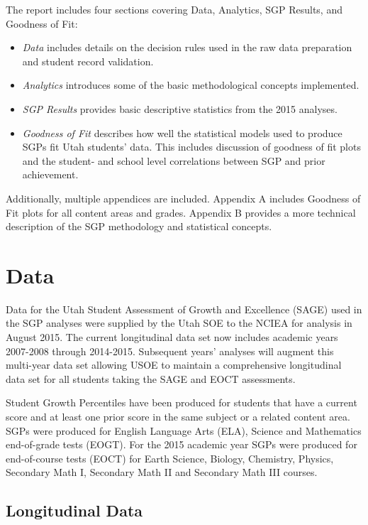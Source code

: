 \documentclass[12pt]{article}
\begin{document}
The report includes four sections covering Data, Analytics, SGP Results,
and Goodness of Fit:

\begin{itemize}
\itemsep1pt\parskip0pt
\item
  \emph{Data} includes details on the decision rules used in the raw
  data preparation and student record validation.
\item
  \emph{Analytics} introduces some of the basic methodological concepts
  implemented.
\item
  \emph{SGP Results} provides basic descriptive statistics from the 2015
  analyses.
\item
  \emph{Goodness of Fit} describes how well the statistical models used
  to produce SGPs fit Utah students' data. This includes discussion of
  goodness of fit plots and the student- and school level correlations
  between SGP and prior achievement.
\end{itemize}

Additionally, multiple appendices are included. Appendix A includes
Goodness of Fit plots for all content areas and grades. Appendix B
provides a more technical description of the SGP methodology and
statistical concepts.

\pagebreak

\section{Data}\label{data}

Data for the Utah Student Assessment of Growth and Excellence (SAGE)
used in the SGP analyses were supplied by the Utah SOE to the NCIEA for
analysis in August 2015. The current longitudinal data set now includes
academic years 2007-2008 through 2014-2015. Subsequent years' analyses
will augment this multi-year data set allowing USOE to maintain a
comprehensive longitudinal data set for all students taking the SAGE and
EOCT assessments.

Student Growth Percentiles have been produced for students that have a
current score and at least one prior score in the same subject or a
related content area. SGPs were produced for English Language Arts
(ELA), Science and Mathematics end-of-grade tests (EOGT). For the 2015
academic year SGPs were produced for end-of-course tests (EOCT) for
Earth Science, Biology, Chemistry, Physics, Secondary Math I, Secondary
Math II and Secondary Math III courses.

\subsection{Longitudinal Data}\label{longitudinal-data}
\end{document}

